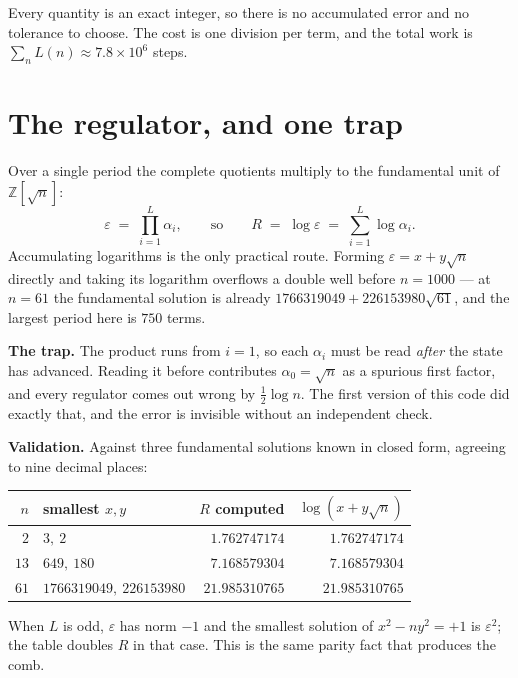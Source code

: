\documentclass[12pt,a4paper]{article}
\begin{document}
Every quantity is an exact integer, so there is no accumulated error and no tolerance to choose. The cost is one division per term, and the total work is $\sum_n L(n) \approx 7.8 \times 10^6$ steps.

\section{The regulator, and one trap}

Over a single period the complete quotients multiply to the fundamental unit of $\mathbb{Z}[\sqrt{n}]$:
\[
  \varepsilon \;=\; \prod_{i=1}^{L} \alpha_i,
  \qquad\text{so}\qquad
  R \;=\; \log\varepsilon \;=\; \sum_{i=1}^{L} \log\alpha_i .
\]
Accumulating logarithms is the only practical route. Forming $\varepsilon = x + y\sqrt{n}$ directly and taking its logarithm overflows a double well before $n = 1000$ --- at $n=61$ the fundamental solution is already $1766319049 + 226153980\sqrt{61}$, and the largest period here is $750$ terms.

\begin{tcolorbox}[colback=yellow!12, colframe=yellow!55!black, arc=2mm]
\textbf{The trap.} The product runs from $i=1$, so each $\alpha_i$ must be read \emph{after} the state has advanced. Reading it before contributes $\alpha_0 = \sqrt{n}$ as a spurious first factor, and every regulator comes out wrong by $\tfrac12\log n$. The first version of this code did exactly that, and the error is invisible without an independent check.
\end{tcolorbox}

\textbf{Validation.} Against three fundamental solutions known in closed form, agreeing to nine decimal places:
\begin{center}
\begin{tabular}{rlrr}
\toprule
$n$ & smallest $x,y$ & $R$ computed & $\log(x+y\sqrt{n})$ \\
\midrule
$2$  & $3,\ 2$                       & $1.762747174$  & $1.762747174$ \\
$13$ & $649,\ 180$                   & $7.168579304$  & $7.168579304$ \\
$61$ & $1766319049,\ 226153980$      & $21.985310765$ & $21.985310765$ \\
\bottomrule
\end{tabular}
\end{center}
When $L$ is odd, $\varepsilon$ has norm $-1$ and the smallest solution of $x^2-ny^2=+1$ is $\varepsilon^2$; the table doubles $R$ in that case. This is the same parity fact that produces the comb.
\end{document}
